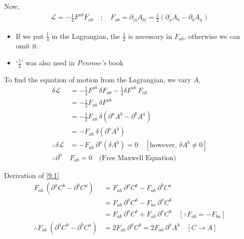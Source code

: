 \documentclass[14pt]{article} %
\begin{document}
Now, 
\begin{align*}
\mathcal{L} = -\frac{1}{4} F^{ab} F_{ab} \quad;\quad F_{ab} = \partial_{[a}A_{b]} = \frac{1}{2} \left(\partial_a A_b - \partial_b A_a\right)
\end{align*}
\begin{tcolorbox}[ proofbox, title=Note about the factor-$\frac{1}{2}$ ]
\begin{itemize}
    \item If we put $\frac{1}{4}$ in the Lagrangian, the $\frac{1}{2}$ is necessary in $F_{ab}$, otherwise we can omit it.
    \item `$\frac{1}{2}$' was also used in \textit{Penrose's} book
\end{itemize}
\end{tcolorbox}
To find the equation of motion from the Lagrangian, we vary $A$,
\begin{align*}
\delta \mathcal{L} &= -\frac{1}{4} F^{ab}~\delta F_{ab}  -\frac{1}{4} \delta F^{ab}~ F_{ab} \\
&= -\frac{1}{2} F_{ab}~ \delta F^{ab} \\
&= -\frac{1}{2} F_{ab}~\delta ( \partial^a A^b - \partial^b A^a ) \\
&= -F_{ab}~ \delta (\partial^a A^b) \tag{9.1} \label{9.1} \\
\therefore \delta \mathcal{L}&= -F_{ab}~ \partial^a (\delta A^b) =0 \quad [\text{however, } \delta A^b \ne 0] \\
\therefore \partial^a &F_{ab} = 0 \quad \text{(Free Maxwell Equation)}
\end{align*}
\begin{tcolorbox}
Derivation of \eqref{9.1}
\begin{align}
F_{ab}~(\partial^a C^b - \partial^b C^a ) &= F_{ab}~\partial^a C^b - F_{ab}~\partial^b C^a  \\
&= F_{ab}~\partial^a C^b - F_{ba}~\partial^a C^b \\
&= F_{ab}~\partial^a C^b + F_{ab}~\partial^a C^b \quad [\because F_{ab} = -F_{ba} ] \\
\therefore F_{ab}~(\partial^a C^b - \partial^b C^a ) &= 2F_{ab}~\partial^a C^b = 2F_{ab}~\partial^a A^b \quad[ C\to A ]
\end{align}
\end{tcolorbox}
\end{document}
